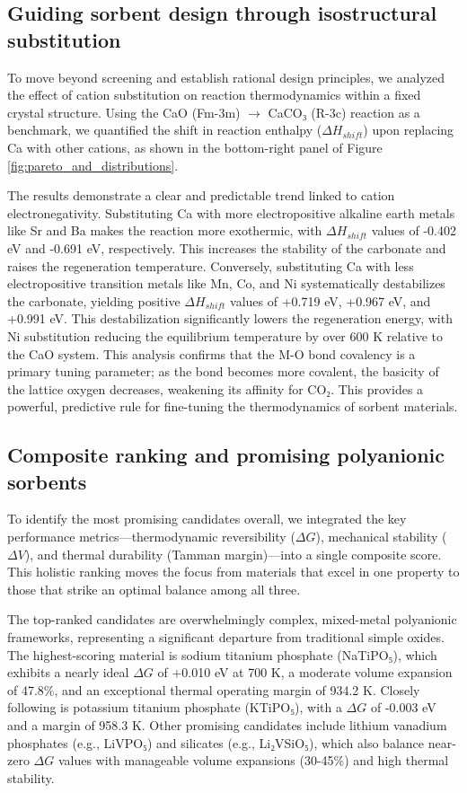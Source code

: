\documentclass[]{article}
\begin{document}
\subsection{Guiding sorbent design through isostructural substitution}
To move beyond screening and establish rational design principles, we analyzed the effect of cation substitution on reaction thermodynamics within a fixed crystal structure. Using the CaO (Fm-3m) $\rightarrow$ CaCO₃ (R-3c) reaction as a benchmark, we quantified the shift in reaction enthalpy ($\Delta H_{shift}$) upon replacing Ca with other cations, as shown in the bottom-right panel of Figure \ref{fig:pareto_and_distributions}.

The results demonstrate a clear and predictable trend linked to cation electronegativity. Substituting Ca with more electropositive alkaline earth metals like Sr and Ba makes the reaction more exothermic, with $\Delta H_{shift}$ values of -0.402 eV and -0.691 eV, respectively. This increases the stability of the carbonate and raises the regeneration temperature. Conversely, substituting Ca with less electropositive transition metals like Mn, Co, and Ni systematically destabilizes the carbonate, yielding positive $\Delta H_{shift}$ values of +0.719 eV, +0.967 eV, and +0.991 eV. This destabilization significantly lowers the regeneration energy, with Ni substitution reducing the equilibrium temperature by over 600 K relative to the CaO system. This analysis confirms that the M-O bond covalency is a primary tuning parameter; as the bond becomes more covalent, the basicity of the lattice oxygen decreases, weakening its affinity for CO₂. This provides a powerful, predictive rule for fine-tuning the thermodynamics of sorbent materials.

\subsection{Composite ranking and promising polyanionic sorbents}
To identify the most promising candidates overall, we integrated the key performance metrics—thermodynamic reversibility ($\Delta G$), mechanical stability ($\Delta V$), and thermal durability (Tamman margin)—into a single composite score. This holistic ranking moves the focus from materials that excel in one property to those that strike an optimal balance among all three.

The top-ranked candidates are overwhelmingly complex, mixed-metal polyanionic frameworks, representing a significant departure from traditional simple oxides. The highest-scoring material is sodium titanium phosphate (NaTiPO₅), which exhibits a nearly ideal $\Delta G$ of +0.010 eV at 700 K, a moderate volume expansion of 47.8\%, and an exceptional thermal operating margin of 934.2 K. Closely following is potassium titanium phosphate (KTiPO₅), with a $\Delta G$ of -0.003 eV and a margin of 958.3 K. Other promising candidates include lithium vanadium phosphates (e.g., LiVPO₅) and silicates (e.g., Li₂VSiO₅), which also balance near-zero $\Delta G$ values with manageable volume expansions (30-45\%) and high thermal stability.
\end{document}
